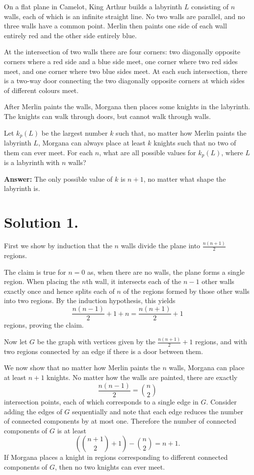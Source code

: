 \begin{problem}
On a flat plane in Camelot, King Arthur builds a labyrinth \( L \) consisting of \( n \) walls, each of which is an infinite straight line. No two walls are parallel, and no three walls have a common point. Merlin then paints one side of each wall entirely red and the other side entirely blue.

At the intersection of two walls there are four corners: two diagonally opposite corners where a red side and a blue side meet, one corner where two red sides meet, and one corner where two blue sides meet. At each such intersection, there is a two-way door connecting the two diagonally opposite corners at which sides of different colours meet.

After Merlin paints the walls, Morgana then places some knights in the labyrinth. The knights can walk through doors, but cannot walk through walls.

Let \( k_p(L) \) be the largest number \( k \) such that, no matter how Merlin paints the labyrinth \( L \), Morgana can always place at least \( k \) knights such that no two of them can ever meet. For each \( n \), what are all possible values for \( k_p(L) \), where \( L \) is a labyrinth with \( n \) walls?
\end{problem}

\textbf{Answer:} The only possible value of \( k \) is \( n + 1 \), no matter what shape the labyrinth is.

\section*{Solution 1.}

First we show by induction that the \( n \) walls divide the plane into \( \frac{n(n+1)}{2} \) regions.

The claim is true for \( n = 0 \) as, when there are no walls, the plane forms a single region. When placing the \( n \)th wall, it intersects each of the \( n - 1 \) other walls exactly once and hence splits each of \( n \) of the regions formed by those other walls into two regions. By the induction hypothesis, this yields 
\[
\frac{n(n-1)}{2} + 1 + n = \frac{n(n+1)}{2} + 1
\]
regions, proving the claim.

Now let \( G \) be the graph with vertices given by the \( \frac{n(n+1)}{2} + 1 \) regions, and with two regions connected by an edge if there is a door between them.

We now show that no matter how Merlin paints the \( n \) walls, Morgana can place at least \( n + 1 \) knights. No matter how the walls are painted, there are exactly 
\[
\frac{n(n-1)}{2} = \binom{n}{2}
\]
intersection points, each of which corresponds to a single edge in \( G \). Consider adding the edges of \( G \) sequentially and note that each edge reduces the number of connected components by at most one. Therefore the number of connected components of \( G \) is at least
\[
\left( \binom{n+1}{2} + 1 \right) - \binom{n}{2} = n + 1.
\]
If Morgana places a knight in regions corresponding to different connected components of \( G \), then no two knights can ever meet. 

